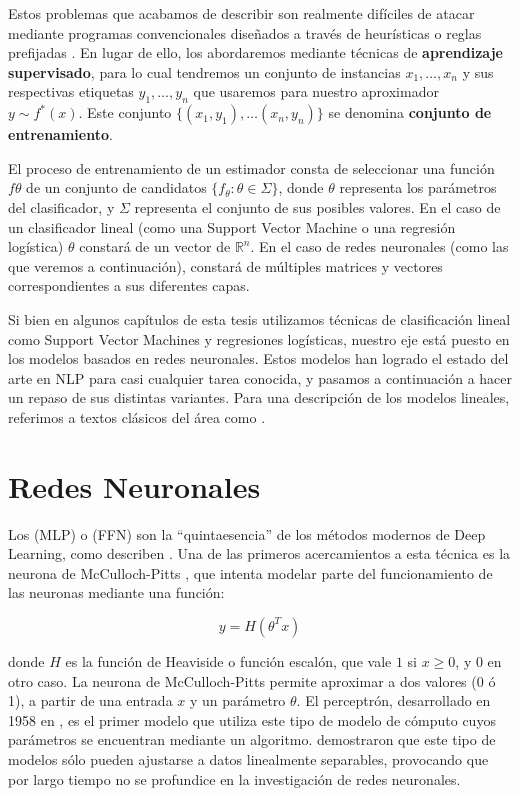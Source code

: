 Estos problemas que acabamos de describir son realmente difíciles de atacar mediante programas convencionales diseñados a través de heurísticas o reglas prefijadas \cite{bishop2006pattern}. En lugar de ello, los abordaremos mediante técnicas de \textbf{aprendizaje supervisado}, para lo cual tendremos un conjunto de instancias $x_1, \ldots, x_n$ y sus respectivas etiquetas $y_1, \ldots , y_n$ que usaremos para  nuestro aproximador $y \sim f^*(x)$. Este conjunto $\{ (x_1, y_1), \ldots (x_n, y_n)\}$ se denomina \textbf{conjunto de entrenamiento}.

El proceso de entrenamiento de un estimador consta de seleccionar una función $f\theta$ de un conjunto de candidatos $\{f_\theta: \theta \in \Sigma\}$, donde $\theta$ representa los parámetros del clasificador, y $\Sigma$ representa el conjunto de sus posibles valores. En el caso de un clasificador lineal (como una Support Vector Machine o una regresión logística) $\theta$ constará de un vector de $\mathbb{R}^n$. En el caso de redes neuronales (como las que veremos a continuación), constará de múltiples matrices y vectores correspondientes a sus diferentes capas.

Si bien en algunos capítulos de esta tesis utilizamos técnicas de clasificación lineal como Support Vector Machines y regresiones logísticas, nuestro eje está puesto en los modelos basados en redes neuronales. Estos modelos han logrado el estado del arte en NLP para casi cualquier tarea conocida, y pasamos a continuación a hacer un repaso de sus distintas variantes. Para una descripción de los modelos lineales, referimos a textos clásicos del área como \citet{bishop2006pattern}.

\section{Redes Neuronales}


Los  (MLP) o  (FFN) son la ``quintaesencia'' de los métodos modernos de Deep Learning, como describen \citet{goodfellow2016deep}. Una de las primeros acercamientos a esta técnica es la neurona de McCulloch-Pitts \cite{mcculloch1943logical}, que intenta modelar parte del funcionamiento de las neuronas mediante una función:

\begin{equation*}
    y = H(\theta^T x)
\end{equation*}

\noindent donde $H$ es la función de Heaviside o función escalón, que vale $1$ si $x \geq 0$, y $0$ en otro caso. La neurona de McCulloch-Pitts permite aproximar a dos valores (0 ó 1), a partir de una entrada $x$ y un parámetro $\theta$. El perceptrón, desarrollado en 1958 en \citet{rosenblatt1958perceptron}, es el primer modelo que utiliza este tipo de modelo de cómputo cuyos parámetros se encuentran mediante un algoritmo. \citet{minsky1969perceptrons} demostraron que este tipo de modelos sólo pueden ajustarse a datos linealmente separables, provocando que por largo tiempo no se profundice en la investigación de redes neuronales.

